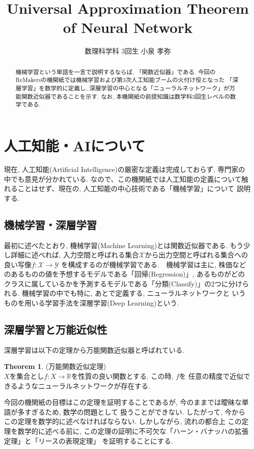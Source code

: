 \documentclass[11pt, a4paper, dvipdfmx]{jsarticle}
\title{Universal Approximation Theorem of Neural Network}
\author{数理科学科 3回生 小泉 孝弥}
\date{}
\theoremstyle{definition}
\newtheorem*{Theorem*}{Theorem}
\newcommand{\R}{\mathbb{R}}
\newcommand{\X}{\mathcal{X}}
\newcommand{\Y}{\mathcal{Y}}
\begin{document}
\maketitle
\begin{abstract}
    機械学習という単語を一言で説明するならば, 「関数近似器」である.
    今回のReMakersの機関紙では機械学習および第3次人工知能ブームの火付け役となった
    「深層学習」を数学的に定義し, 深層学習の中心となる「ニューラルネットワーク」が万能関数近似器であることを示す.
    なお, 本機関紙の前提知識は数学科3回生レベルの数学である.
\end{abstract}
\section{人工知能・AIについて}
現在, 人工知能(Artificial Intelligence)の厳密な定義は完成しておらず, 専門家の中でも意見が分かれている.
なので、この機関紙では人工知能の定義について触れることはせず、現在の, 人工知能の中心技術である「機械学習」について
説明する.
\subsection{機械学習・深層学習}
最初に述べたとおり, 機械学習(Machine Learning)とは関数近似器である. 
もう少し詳細に述べれば, 入力空間と呼ばれる集合$\X$から出力空間と呼ばれる集合への良い写像$f:\X\to\Y$
を構成するのが機械学習である.　機械学習は主に, 株価などのあるものの値を予想するモデルである「回帰(Regression)」, 
あるものがどのクラスに属しているかを予測するモデルである「分類(Classify)」の2つに分けられる. 機械学習の中でも特に, あとで定義する, ニューラルネットワークと
いうものを用いる学習手法を深層学習(Deep Learning)という.
\subsection{深層学習と万能近似性}
深層学習は以下の定理から万能関数近似器と呼ばれている. 
\begin{Theorem*}(万能関数近似定理)\\
    $X$を集合とし$f:X\to\R$を性質の良い関数とする. この時, $f$を
    任意の精度で近似できるようなニューラルネットワークが存在する.
\end{Theorem*}
今回の機関紙の目標はこの定理を証明することであるが, 今のままでは曖昧な単語が多すぎるため, 数学の問題として
扱うことができない. したがって, 今からこの定理を数学的に述べなければならない. しかしながら, 流れの都合上
この定理を数学的に述べる前に, この定理の証明に不可欠な「ハーン・バナッハの拡張定理」と「リースの表現定理」
を証明することにする.
\end{document}
